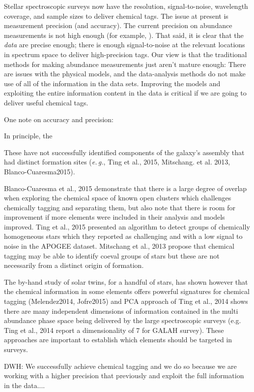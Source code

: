 \documentclass[12pt, letterpaper, preprint]{aastex}
\newcommand{\foreign}[1]{\textsl{#1}}
\newcommand{\eg}{\foreign{e.\,g.}}
\begin{document}
Stellar spectroscopic surveys now have the resolution, signal-to-noise,
wavelength coverage, and sample sizes to deliver chemical tags.
The issue at present is measurement precision (and accuracy).
The current precision on abundance measurements is not high enough
(for example, \citealt{Ting2015, Martel2015}).
That said, it is clear that the \emph{data} are precise enough;
there is enough signal-to-noise at the relevant locations in spectrum
space to deliver high-precision tags.
Our view is that the traditional methods for making abundance
measurements just aren't mature enough:
There are issues with the physical models, and the data-analysis
methods do not make use of all of the information in the data sets.
Improving the models and exploiting the entire information
content in the data is critical if we are going to deliver useful
chemical tags.

One note on accuracy and precision:

In principle, the 

These have not successfully identified components of the galaxy's
assembly that had distinct formation sites (\eg, Ting et al., 2015, Mitschang. et al. 2013,
Blanco-Cuaresma2015).

Blanco-Cuaresma et al., 2015 demonstrate that there is a large degree
of overlap when exploring the chemical space of known open clusters
which challenges chemically tagging and separating them, but also note
that there is room for improvement if more elements were included in
their analysis and models improved.
Ting et al., 2015 presented an algorithm to detect groups of
chemically homogeneous stars which they reported as challenging and
with a low signal to noise in the APOGEE dataset.
Mitschang et al., 2013 propose that chemical tagging may be able to
identify coeval groups of stars but these are not necessarily from a
distinct origin of formation.

The by-hand study of solar twins, for a handful of stars, has shown
however that the chemical information in some elements offers powerful
signatures for chemical tagging (Melendez2014, Jofre2015) and PCA
approach of Ting et al., 2014 shows there are many independent
dimensions of information contained in the multi abundance phase space
being delivered by the large spectroscopic surveys (e.g. Ting et al.,
2014 report a dimensionality of 7 for GALAH survey).
These approaches are important to establish which elements should be
targeted in surveys.

DWH:  We successfully achieve chemical tagging and we do so because we are
working with a higher precision that previously and exploit the full
information in the data....
\end{document}
